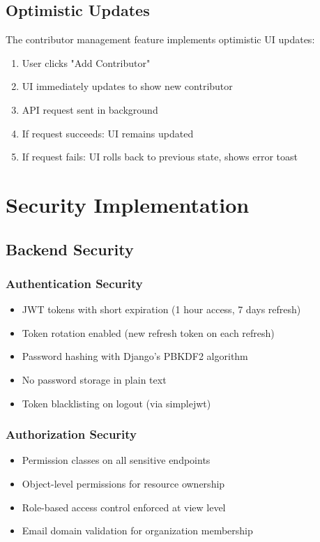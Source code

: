 \documentclass[11pt,a4paper]{article}
\begin{document}
\subsection{Optimistic Updates}
The contributor management feature implements optimistic UI updates:

\begin{enumerate}[leftmargin=*]
    \item User clicks "Add Contributor"
    \item UI immediately updates to show new contributor
    \item API request sent in background
    \item If request succeeds: UI remains updated
    \item If request fails: UI rolls back to previous state, shows error toast
\end{enumerate}

\section{Security Implementation}

\subsection{Backend Security}

\subsubsection{Authentication Security}
\begin{itemize}[leftmargin=*]
    \item JWT tokens with short expiration (1 hour access, 7 days refresh)
    \item Token rotation enabled (new refresh token on each refresh)
    \item Password hashing with Django's PBKDF2 algorithm
    \item No password storage in plain text
    \item Token blacklisting on logout (via simplejwt)
\end{itemize}

\subsubsection{Authorization Security}
\begin{itemize}[leftmargin=*]
    \item Permission classes on all sensitive endpoints
    \item Object-level permissions for resource ownership
    \item Role-based access control enforced at view level
    \item Email domain validation for organization membership
\end{itemize}
\end{document}
